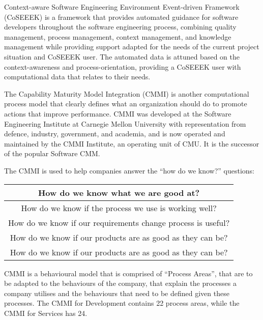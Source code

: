 \documentclass{article}
\begin{document}
Context-aware Software Engineering Environment Event-driven Framework (CoSEEEK) is a framework that provides automated guidance for software developers throughout the software engineering process, combining quality management, process management, context management, and knowledge management while providing support adapted for the needs of the current project situation and CoSEEEK user. The automated data is attuned based on the context-awareness and process-orientation, providing a CoSEEEK user with computational data that relates to their needs. \cite{coseeek} \newline

The Capability Maturity Model Integration (CMMI) is another computational process model that clearly defines what an organization should do to promote actions that improve performance. CMMI was developed at the Software Engineering Institute at Carnegie Mellon University with representation from defence, industry, government, and academia, and is now operated and maintained by the CMMI Institute, an operating unit of CMU. It is the successor of the popular Software CMM. \cite{cmmi} \newline

The CMMI is used to help companies answer the “how do we know?” questions: 

\begin{center}
\begin{tabular}{||c||} 
\hline How do we know what we are good at? \\ 
\hline
How do we know if the process we use is working well? \\ 
\hline
How do we know if our requirements change process is useful? \\
\hline
How do we know if our products are as good as they can be? \\
\hline
How do we know if our products are as good as they can be? \\
\hline
\end{tabular} \newline
\end{center} 

CMMI is a behavioural model that is comprised of ``Process Areas'', that are to be adapted to the behaviours of the company, that explain the processes a company utilises and the behaviours that need to be defined given these processes. The CMMI for Development contains 22 process areas, while the CMMI for Services has 24. \newline
\end{document}
